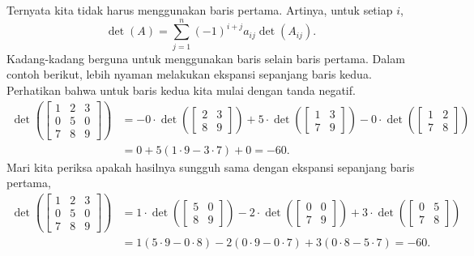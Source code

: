 Ternyata kita tidak harus menggunakan baris pertama.
Artinya, untuk setiap $i$,
\begin{equation*}
\det (A)
=
\sum_{j=1}^n
{(-1)}^{i+j}
a_{ij} \det (A_{ij}) .
\end{equation*}
Kadang-kadang berguna untuk menggunakan baris selain baris pertama. Dalam contoh berikut,
lebih nyaman melakukan ekspansi sepanjang baris kedua. Perhatikan bahwa untuk
baris kedua kita mulai dengan tanda negatif.
\begin{equation*}
\begin{split}
\det \left(
\begin{bmatrix}
1 & 2 & 3 \\
0 & 5 & 0 \\
7 & 8 & 9
\end{bmatrix}
\right)
& =
- 0 \cdot
\det \left(
\begin{bmatrix}
2 & 3 \\
8 & 9
\end{bmatrix}
\right)
+
5 \cdot
\det \left(
\begin{bmatrix}
1 & 3 \\
7 & 9
\end{bmatrix}
\right)
-
0 \cdot
\det \left(
\begin{bmatrix}
1 & 2 \\
7 & 8
\end{bmatrix}
\right) \\
& =
0
+
5 (1 \cdot 9 - 3 \cdot 7)
+
0
= -60 .
\end{split}
\end{equation*}
Mari kita periksa apakah hasilnya sungguh sama dengan ekspansi sepanjang baris pertama,
\begin{equation*}
\begin{split}
\det \left(
\begin{bmatrix}
1 & 2 & 3 \\
0 & 5 & 0 \\
7 & 8 & 9
\end{bmatrix}
\right)
& =
1 \cdot
\det \left(
\begin{bmatrix}
5 & 0 \\
8 & 9
\end{bmatrix}
\right)
-
2 \cdot
\det \left(
\begin{bmatrix}
0 & 0 \\
7 & 9
\end{bmatrix}
\right)
+
3 \cdot
\det \left(
\begin{bmatrix}
0 & 5 \\
7 & 8
\end{bmatrix}
\right) \\
& =
1 (5 \cdot 9 - 0 \cdot 8)
-
2 (0 \cdot 9 - 0 \cdot 7)
+
3 (0 \cdot 8 - 5 \cdot 7)
= -60 .
\end{split}
\end{equation*}



